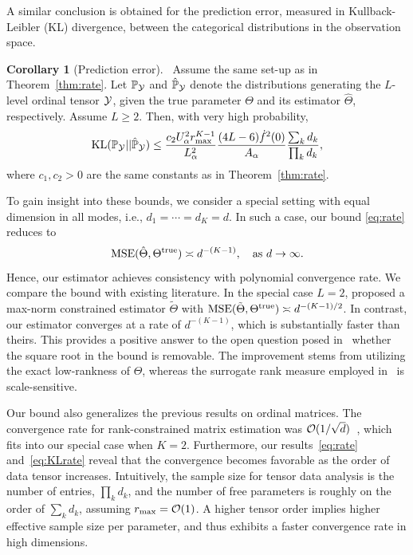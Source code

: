 \documentclass[11pt]{article}
\theoremstyle{plain}
\theoremstyle{definition}
\newtheorem{cor}{Corollary}
\begin{document}
A similar conclusion is obtained for the prediction error, measured in Kullback-Leibler (KL) divergence, between the categorical distributions in the observation space.
\begin{cor}[Prediction error]~\label{cor:prediction}
Assume the same set-up as in Theorem~\ref{thm:rate}. Let $\mathbb{P}_{\mathcal{Y}}$ and $\hat{\mathbb{P}}_{\mathcal{Y}}$ denote the distributions generating the $L$-level ordinal tensor $\mathcal{Y}$, given the true parameter $\Theta$ and its estimator $\hat \Theta$, respectively. Assume $L\geq 2$. Then, with very high probability,
\begin{equation}\label{eq:KLrate}
\text{KL}(\mathbb{P}_{\mathcal{Y}} || \hat{\mathbb{P}}_{\mathcal{Y}}) \leq  {c_2 U^2_\alpha r_{\max}^{K-1}  \over L^2_\alpha } {(4L-6)\dot{f}^2(0)  \over A_\alpha} {\sum_kd_k\over  \prod_k d_k},
\end{equation}
where $c_1, c_2>0$ are the same constants as in Theorem~\ref{thm:rate}.
\end{cor}
To gain insight into these bounds, we consider a special setting with equal dimension in all modes, i.e., $d_1=\cdots=d_K=d$. In such a case, our bound \eqref{eq:rate} reduces to
\begin{equation*}\label{eq:ours}
\text{MSE}(\hat \Theta, \Theta^{\mathrm{true}}) \asymp d^{-(K-1)}, \quad \text{as}\ d\to \infty.
\end{equation*}
Hence, our estimator achieves consistency with polynomial convergence rate. We compare the bound with existing literature. In the special case $L=2$, \citet{ghadermarzy2018learning} proposed a max-norm constrained estimator $\tilde{\Theta}$ with $\text{MSE}(\tilde{\Theta}, \Theta^{\mathrm{true}}) \asymp  d^{-(K-1)/2}$. In contrast, our estimator converges at a rate of $d^{-(K-1)}$, which is substantially faster than theirs. This provides a positive answer to the open question posed in~\citet{ghadermarzy2018learning} whether the square root in the bound is removable. The improvement stems from utilizing the exact low-rankness of $\Theta$, whereas the surrogate rank measure employed in~\citet{ghadermarzy2018learning} is scale-sensitive.

Our bound also generalizes the previous results on ordinal matrices. The convergence rate for rank-constrained matrix estimation was $\mathcal{O}(1/\sqrt{d})$~\citep{bhaskar2016probabilistic}, which fits into our special case when $K=2$. Furthermore, our results~\eqref{eq:rate} and~\eqref{eq:KLrate} reveal that the convergence becomes favorable as the order of data tensor increases. Intuitively, the sample size for tensor data analysis is the number of entries, $\prod_k d_k$, and the number of free parameters is roughly on the order of $\sum_{k}d_k$, assuming $r_{\max}=\mathcal{O}(1)$. A higher tensor order implies higher effective sample size per parameter, and thus exhibits a faster convergence rate in high dimensions.
\end{document}
